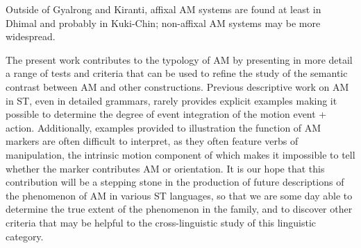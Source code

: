 \documentclass[oneside,a4paper,11pt]{article}
\begin{document}
Outside of Gyalrong and Kiranti, affixal AM systems are found at least in Dhimal and probably in Kuki-Chin; non-affixal AM systems may be more widespread.


The present work contributes to the typology of AM by presenting in more detail a range of tests and criteria that can be used to refine the study of the semantic contrast between AM and other constructions. Previous descriptive work on AM in ST, even in detailed grammars, rarely provides explicit examples making it possible to determine the degree of event integration of the motion event + action.  Additionally, examples provided to illustration the function of AM markers are often difficult to interpret, as they often feature verbs of manipulation, the intrinsic motion component of which makes it impossible to tell whether the marker contributes AM or orientation.  It is our hope that this contribution will be a stepping stone in the production of future descriptions of the phenomenon of AM in various ST languages, so that we are some day able to determine the true extent of the phenomenon in the family, and to discover other criteria that may be helpful to the cross-linguistic study of this linguistic category.
\end{document}
